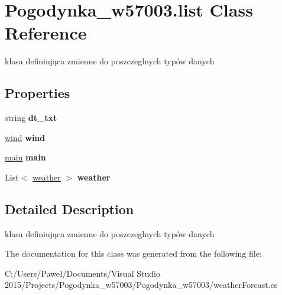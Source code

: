 \hypertarget{class_pogodynka__w57003_1_1list}{}\section{Pogodynka\+\_\+w57003.\+list Class Reference}
\label{class_pogodynka__w57003_1_1list}


klasa definiująca zmienne do poszczeglnych typów danych  


\subsection*{Properties}
\begin{DoxyCompactItemize}
\item 
\mbox{\label{class_pogodynka__w57003_1_1list_ae9b9dcbb2a0d9f5dd950bc0f013327c5}} 
string {\bfseries dt\+\_\+txt}
\item 
\mbox{\label{class_pogodynka__w57003_1_1list_aa9e8fb1a4f3ed369b3873e3a0fa09357}} 
\mbox{\hyperlink{class_pogodynka__w57003_1_1wind}{wind}} {\bfseries wind}
\item 
\mbox{\label{class_pogodynka__w57003_1_1list_a022a0fd0e9b0dd60f302dcdfa1a80ae9}} 
\mbox{\hyperlink{class_pogodynka__w57003_1_1main}{main}} {\bfseries main}
\item 
\mbox{\label{class_pogodynka__w57003_1_1list_aab12839c65ae24bf60f65b092210b5a4}} 
List$<$ \mbox{\hyperlink{class_pogodynka__w57003_1_1weather}{weather}} $>$ {\bfseries weather}
\end{DoxyCompactItemize}


\subsection{Detailed Description}
klasa definiująca zmienne do poszczeglnych typów danych 



The documentation for this class was generated from the following file\+:\begin{DoxyCompactItemize}
\item 
C\+:/\+Users/\+Paweł/\+Documents/\+Visual Studio 2015/\+Projects/\+Pogodynka\+\_\+w57003/\+Pogodynka\+\_\+w57003/weather\+Forcast.\+cs\end{DoxyCompactItemize}
